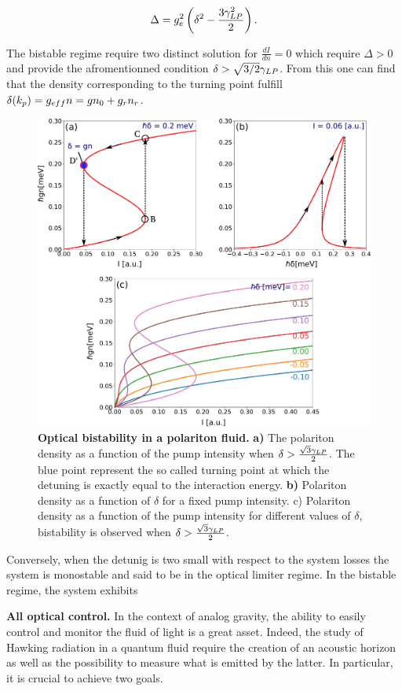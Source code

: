 \begin{equation}
    \Delta = g_{e}^2 \left( \delta^2 - \dfrac{3\gamma_{LP}^2}{2}\right).
\end{equation}

The bistable regime require two distinct solution for $\frac{dI}{dn}=0$ which require $\Delta>0$ and provide the afromentionned condition $\delta>\sqrt{3/2}\gamma_{LP}$.
From this one can find that the density corresponding to the turning point fulfill $\delta(k_p)=g_{eff}n = gn_0+g_rn_r$. 

\begin{figure}
    \centering
    \includegraphics[width=0.8\linewidth]{chap_theory/fig/bistability.pdf}
    \caption{\textbf{Optical bistability in a polariton fluid.} \textbf{a)} The polariton density as a function of the pump intensity when $\delta>\frac{\sqrt{3}\gamma_{LP}}{2}$. The blue point represent the so called turning point at which the detuning is exactly equal to the interaction energy.
    \textbf{b)} Polariton density as a function of $\delta$ for a fixed pump intensity. c) Polariton density as a function of the pump intensity for different values of $\delta$, bistability is observed when $\delta>\frac{\sqrt{3}\gamma_{LP}}{2}$.}
    \label{fig:bistability}
\end{figure}

Conversely, when the detunig is two small with respect to the system losses the system is monostable and said to be in the optical limiter regime.
In the bistable regime, the system exhibits 


\textbf{All optical control.} In the context of analog gravity, the ability to easily control and monitor the fluid of light is a great asset. Indeed, the study of 
Hawking radiation in a quantum fluid require the creation of an acoustic horizon as well as the possibility to measure what is emitted by the latter. In particular,
it is crucial to achieve two goals. 

